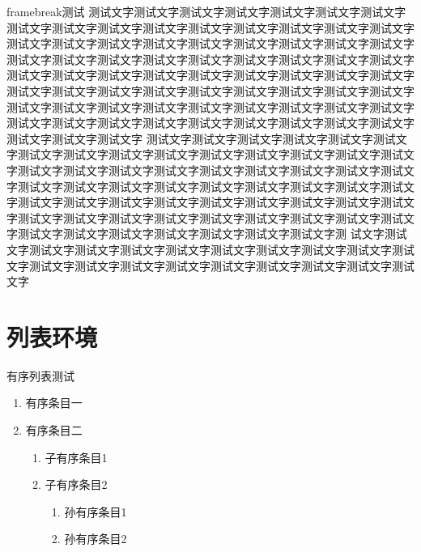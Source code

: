 \begin{frame}[allowframebreaks]{framebreak测试}
测试文字测试文字测试文字测试文字测试文字测试文字测试文字测试文字测试文字测试文字测试文字测试文字测试文字测试文字测试文字测试文字测试文字测试文字测试文字测试文字测试文字测试文字测试文字测试文字测试文字测试文字测试文字测试文字测试文字测试文字测试文字测试文字测试文字测试文字测试文字测试文字测试文字测试文字测试文字测试文字测试文字测试文字测试文字测试文字测试文字测试文字测试文字测试文字测试文字测试文字测试文字测试文字测试文字测试文字测试文字测试文字测试文字测试文字测试文字测试文字测试文字测试文字测试文字测试文字测试文字测试文字测试文字测试文字测试文字测试文字测试文字测试文字测试文字
\framebreak
测试文字测试文字测试文字测试文字测试文字测试文字测试文字测试文字测试文字测试文字测试文字测试文字测试文字测试文字测试文字测试文字测试文字测试文字测试文字测试文字测试文字测试文字测试文字测试文字测试文字测试文字测试文字测试文字测试文字测试文字测试文字测试文字测试文字测试文字测试文字测试文字测试文字测试文字测试文字测试文字测试文字测试文字测试文字测试文字测试文字测试文字测试文字测试文字测试文字测试文字测试文字测试文字测试文字测试文字测试文字测试文字测试文字测试文字测
\framebreak
试文字测试文字测试文字测试文字测试文字测试文字测试文字测试文字测试文字测试文字测试文字测试文字测试文字测试文字测试文字测试文字测试文字测试文字测试文字测试文字
\end{frame}

\section{列表环境}
\begin{frame}{有序列表测试}
    \begin{enumerate}
        \item 有序条目一
        \item 有序条目二
            \begin{enumerate}
                \item 子有序条目1
                \item 子有序条目2
                    \begin{enumerate}
                        \item 孙有序条目1
                        \item 孙有序条目2
                    \end{enumerate}
            \end{enumerate}
    \end{enumerate}
\end{frame}

